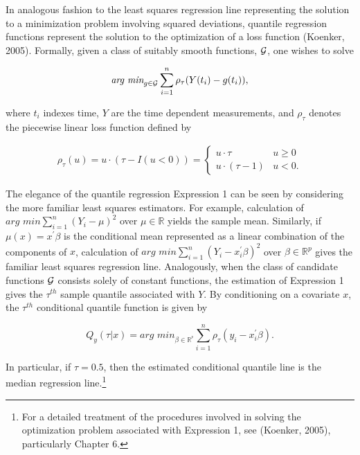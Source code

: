 \documentclass[12pt]{article}
\begin{document}
In analogous fashion to the least squares regression line representing
the solution to a minimization problem involving squared deviations,
quantile regression functions represent the solution to the optimization
of a loss function (Koenker, 2005). Formally, given a class of suitably
smooth functions, \(\cal{G}\), one wishes to solve

\begin{equation} \textit{arg min}_ {g \in \cal{G}} \sum_ {i=1}^n \rho_ {\tau} (Y(t_ i) - g(t_ i)),\end{equation}

where \(t_i\) indexes time, \(Y\) are the time dependent measurements,
and \(\rho_{\tau}\) denotes the piecewise linear loss function defined
by

\begin{multline} \rho_ {\tau} (u) = u \cdot (\tau - I(u < 0)) = \begin{cases} u \cdot \tau & u \geq 0 \\ u \cdot (\tau - 1) & u < 0.  \end{cases}\end{multline}

The elegance of the quantile regression Expression 1 can be seen by
considering the more familiar least squares estimators. For example,
calculation of \(\textit{arg min} \sum_ {i=1}^n (Y_ i - \mu)^2\) over
\(\mu \in \mathbb{R}\) yields the sample mean. Similarly, if
\(\mu(x) = x^{\prime} \beta\) is the conditional mean represented as a
linear combination of the components of \(x\), calculation of
\(\textit{arg min} \sum_ {i=1}^n (Y_ i - x_ i^{\prime} \beta)^2\) over
\(\beta \in \mathbb{R}^p\) gives the familiar least squares regression
line. Analogously, when the class of candidate functions \(\cal{G}\)
consists solely of constant functions, the estimation of Expression 1
gives the \(\tau\)\(^{th}\) sample quantile associated with \(Y\). By
conditioning on a covariate \(x\), the \(\tau\)\(^{th}\) conditional
quantile function is given by

\begin{equation} Q_y (\tau | x) = \textit{arg min}_{\beta \in \mathbb{R}^{^p}} \sum_{i=1}^n \rho_{\tau} (y_i - x_i^{\prime} \beta).\end{equation}

In particular, if \(\tau=0.5\), then the estimated conditional quantile
line is the median regression line.\footnote{For a detailed treatment of
  the procedures involved in solving the optimization problem associated
  with Expression 1, see (Koenker, 2005), particularly Chapter 6.}
\end{document}
